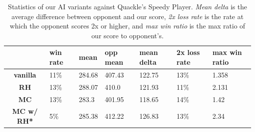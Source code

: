 \documentclass[12pt]{article}
\begin{document}
\begin{table}[h!]
  \centering
  \begin{tabular}{c|l|l|l|l|l|l}
    \textbf{} & \textbf{win rate} & \textbf{mean} & \textbf{opp mean} & \textbf{mean delta} &  \textbf{2x loss rate} & \textbf{max win ratio} \\\hline
  \textbf{vanilla}   & 11\% & 284.68 & 407.43 & 122.75 & 13\% & 1.358\\
  \textbf{RH}        & 13\% & 288.07 & 410.0  & 121.93 & 11\% & 2.131\\
  \textbf{MC}        & 13\% & 283.3  & 401.95 & 118.65 & 14\% & 1.42 \\
  \textbf{MC w/ RH*} & 5\%  & 285.38 & 412.22 & 126.83 & 13\% & 2.34 \\
\end{tabular}
  \caption{Statistics of our AI variants against Quackle's Speedy
    Player. \emph{Mean delta} is the average difference between
    opponent and our score, \emph{2x loss rate} is the rate at which
    the opponent scores 2x or higher, and \emph{max win ratio} is the
    max ratio of our score to opponent's.}
\end{table}
\end{document}

